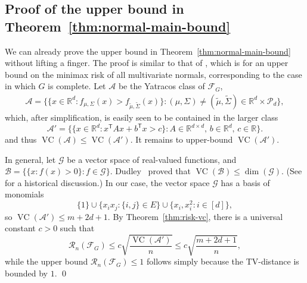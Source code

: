 \documentclass[letterpaper]{amsart}
\newcommand{\sP}{\mathcal{P}}
\newcommand{\sG}{\mathcal{G}}
\newcommand{\sF}{\mathcal{F}}
\newcommand{\sR}{\mathcal{R}}
\newcommand{\sA}{\mathcal{A}}
\newcommand{\sB}{\mathcal{B}}
\newcommand{\R}{\mathbb{R}}
\DeclareMathOperator{\VC}{VC}
\newcommand{\seclabel}[1]{\label{sec:#1}}
\newcommand{\thmref}[1]{Theorem~\ref{thm:#1}}
\numberwithin{thm}{section}
\theoremstyle{definition}
\theoremstyle{plain}
\renewcommand{\tilde}[1]{\widetilde{#1}}
\newcommand{\transpose}{^{\mathsf{T}}}
\begin{document}
\subsection{Proof of the upper bound in \thmref{normal-main-bound}}\seclabel{normal-upper}
We can already prove the upper bound in \thmref{normal-main-bound}
without lifting a finger.  The proof is similar to that of
\cite[Theorem 13]{abbas-mixtures}, which is for an upper bound on the
minimax risk of all multivariate normals, corresponding to the case in
which $G$ is complete.  Let $\sA$ be the Yatracos class of $\sF_G$,
\begin{align*}
  \sA = \Big\{\{x \in \R^d \colon f_{\mu,\Sigma}(x) > f_{\tilde{\mu},\tilde{\Sigma}}(x)\} \colon (\mu,\Sigma) \neq (\tilde{\mu},\tilde{\Sigma}) \in \R^d \times \sP_d \Big\} ,
\end{align*}
which, after simplification, is easily seen to be contained in the
larger class
\[
  \sA' = \Big\{\{x \in \R^d \colon x\transpose A x + b\transpose x > c\} \colon A \in \R^{d \times d}, \, b \in \R^d, \, c \in \R \Big\} .
\]
and thus $\VC(\sA) \le \VC(\sA')$. It remains to upper-bound
$\VC(\sA')$.

In general, let $\sG$ be a vector space of real-valued functions, and
$\sB = \{\{x \colon f(x) > 0\} \colon f \in
\sG\}$. Dudley~\cite[Theorem~7.2]{dudley_vectorspace} proved that
$\VC(\sB) \le \dim(\sG)$. (See \cite[Lemma~4.2]{devroye-lugosi} for a
historical discussion.) In our case, the vector space $\sG$ has a
basis of monomials
\[
  \{1\} \cup \{x_i x_j \colon \{i, j\} \in E\} \cup \{x_i,x_i^2 \colon i\in[d]\} ,
\]
so $\VC(\sA') \le m + 2d+1$. By \thmref{risk-vc}, there is a universal
constant $c > 0$ such that
\[
  \sR_n(\sF_G) \le c \sqrt{\frac{\VC(\sA')}{n}} \le c \sqrt{\frac{m + 2d+1}{n}} ,
\]
while the upper bound $\sR_n(\sF_G) \leq 1$ follows simply because the
TV-distance is bounded by $1$. \qed
\end{document}
